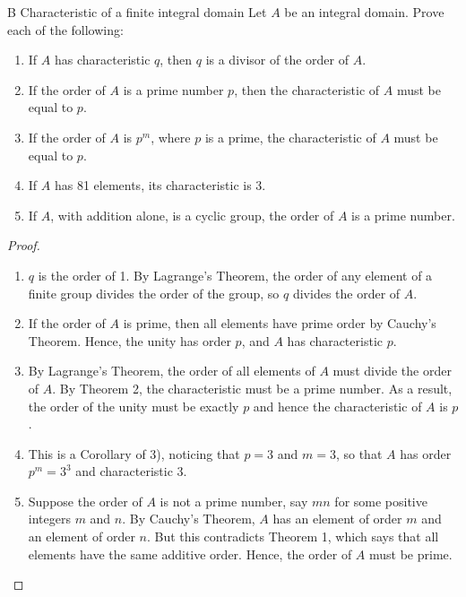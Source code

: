 \begin{exercise}{B Characteristic of a finite integral domain}
Let $A$ be an integral domain. Prove each of the following:
  \begin{enumerate}
      \item If $A$ has characteristic $q$, then $q$ is a divisor of the order of $A$.
      \item If the order of $A$ is a prime number $p$, then the characteristic of $A$ must be equal to $p$.
      \item If the order of $A$ is $p^{m}$, where $p$ is a prime, the characteristic of $A$ must be equal to $p$.
      \item If $A$ has 81 elements, its characteristic is 3.
      \item If $A$, with addition alone, is a cyclic group, the order of $A$ is a prime number.
  \end{enumerate}
\end{exercise}
\begin{proof}
 \begin{enumerate}
     \item $q$ is the order of 1. By Lagrange's Theorem, the order of any element of a finite group divides the order of the group, so $q$ divides the order of $A$.
     \item If the order of $A$ is prime, then all elements have prime order by Cauchy's Theorem. Hence, the unity has order $p$, and $A$ has characteristic $p$.
     \item By Lagrange's Theorem, the order of all elements of $A$ must divide the order of $A$. By Theorem 2, the characteristic must be a prime number. As a result, the order of the unity must be exactly $p$ and hence the characteristic of $A$ is $p$.
     \item This is a Corollary of 3), noticing that $p=3$ and $m=3$, so that $A$ has order $p^{m}=3^{3}$ and characteristic 3.
     \item Suppose the order of $A$ is not a prime number, say $mn$ for some positive integers $m$ and $n$. By Cauchy's Theorem, $A$ has an element of order $m$ and an element of order $n$. But this contradicts Theorem 1, which says that all elements have the same additive order. Hence, the order of $A$ must be prime.
 \end{enumerate}
\end{proof}



